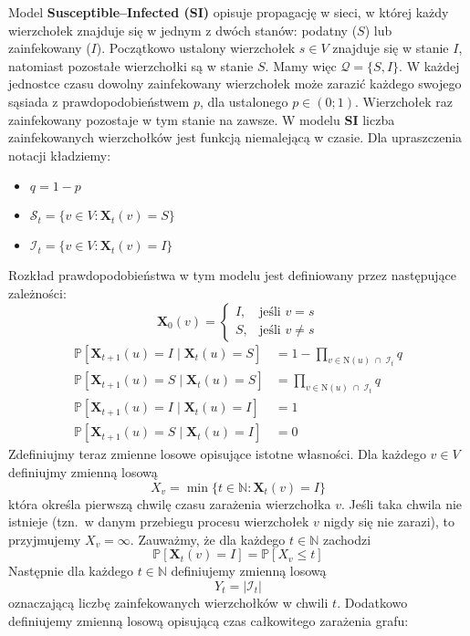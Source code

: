 Model \textbf{Susceptible--Infected (SI)} opisuje propagację w sieci, w której każdy wierzchołek znajduje się w jednym z dwóch stanów: podatny ($S$) lub zainfekowany ($I$).  
Początkowo ustalony wierzchołek $s \in V$ znajduje się w stanie $I$, natomiast pozostałe wierzchołki są w stanie $S$. Mamy więc $\mathcal{Q} = \{S, I\}$.
W każdej jednostce czasu dowolny zainfekowany wierzchołek może zarazić każdego swojego sąsiada z prawdopodobieństwem $p$, dla ustalonego $p \in (0;1)$.  
Wierzchołek raz zainfekowany pozostaje w tym stanie na zawsze.  
W modelu \textbf{SI} liczba zainfekowanych wierzchołków jest funkcją niemalejącą w czasie.
Dla upraszczenia notacji kładziemy: 
\begin{itemize}
    \item $q=1-p$
    \item $\mathcal{S}_t=\{v\in V: \mathbf{X}_t(v) = S\}$
    \item $\mathcal{I}_t=\{v\in V: \mathbf{X}_t(v) = I\}$
\end{itemize}
Rozkład prawdopodobieństwa w tym modelu jest definiowany przez następujące zależności:
\[
\mathbf{X}_0(v) =
\begin{cases}
I, & \text{jeśli } v = s \\[4pt]
S, & \text{jeśli } v \neq s
\end{cases}
\]
\[
\begin{aligned}
\mathbb{P}[\mathbf{X}_{t+1}(u) = I \mid \mathbf{X}_t(u) = S]
 &= 1 - \prod_{v \in \mathrm{N}(u) \;\cap\; \mathcal{I}_t} q \\[6pt]
\mathbb{P}[\mathbf{X}_{t+1}(u) = S \mid \mathbf{X}_t(u) = S]
 &= \prod_{v \in \mathrm{N}(u) \;\cap\; \mathcal{I}_t} q \\[6pt]
\mathbb{P}[\mathbf{X}_{t+1}(u) = I \mid \mathbf{X}_t(u) = I]
 &= 1 \\[6pt]
\mathbb{P}[\mathbf{X}_{t+1}(u) = S \mid \mathbf{X}_t(u) = I]
 &= 0
\end{aligned}
\]
Zdefiniujmy teraz zmienne losowe opisujące istotne własności.
Dla każdego $v \in V$ definiujmy zmienną losową
\[
X_v = \min \{ t \in \mathbb{N} : \mathbf{X}_t(v) = I \}
\]
która określa pierwszą chwilę czasu zarażenia wierzchołka $v$.
Jeśli taka chwila nie istnieje (tzn.\ w danym przebiegu procesu wierzchołek $v$ nigdy się nie zarazi), to przyjmujemy $X_v = \infty$.
Zauważmy, że dla każdego $t \in \mathbb{N}$ zachodzi 
\[
    \mathbb{P}[\mathbf{X}_t(v) = I] = \mathbb{P}[X_v \le t]
\]
Następnie dla każdego $t\in\mathbb{N}$ definiujemy zmienną losową 
\[
    Y_t = |\mathcal{I}_t|
\]
oznaczającą liczbę zainfekowanych wierzchołków w chwili $t$. Dodatkowo definiujemy zmienną losową opisującą czas całkowitego zarażenia grafu:
